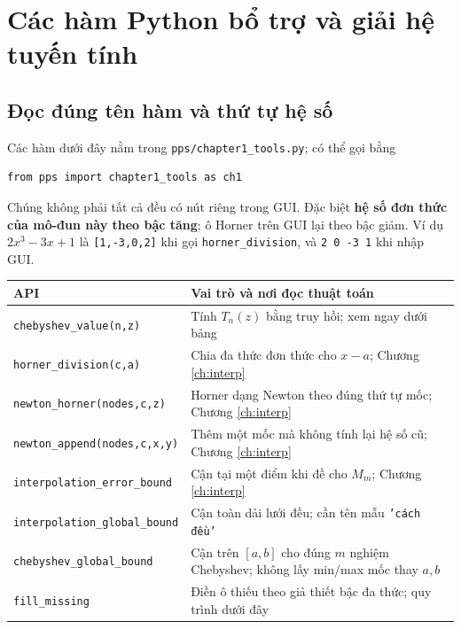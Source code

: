 \chapter{Các hàm Python bổ trợ và giải hệ tuyến tính}
\label{app:api}

\section{Đọc đúng tên hàm và thứ tự hệ số}
Các hàm dưới đây nằm trong \texttt{pps/chapter1\_tools.py}; có thể gọi bằng
\begin{verbatim}
from pps import chapter1_tools as ch1
\end{verbatim}
Chúng không phải tất cả đều có nút riêng trong GUI. Đặc biệt \textbf{hệ số đơn thức của mô-đun này theo bậc tăng}; ô Horner trên GUI lại theo bậc giảm. Ví dụ $2x^3-3x+1$ là \texttt{[1,-3,0,2]} khi gọi \texttt{horner\_division}, và \texttt{2 0 -3 1} khi nhập GUI.

\begin{center}\small\begin{tabular}{@{}p{}p{}@{}}\toprule
API & Vai trò và nơi đọc thuật toán\\\midrule
\texttt{chebyshev\_value(n,z)} & Tính $T_n(z)$ bằng truy hồi; xem ngay dưới bảng\\
\texttt{horner\_division(c,a)} & Chia đa thức đơn thức cho $x-a$; Chương \ref{ch:interp}\\
\texttt{newton\_horner(nodes,c,z)} & Horner dạng Newton theo đúng thứ tự mốc; Chương \ref{ch:interp}\\
\texttt{newton\_append(nodes,c,x,y)} & Thêm một mốc mà không tính lại hệ số cũ; Chương \ref{ch:interp}\\
\texttt{interpolation\_error\_bound} & Cận tại một điểm khi đề cho $M_m$; Chương \ref{ch:interp}\\
\texttt{interpolation\_global\_bound} & Cận toàn dải lưới đều; cần tên mẫu \texttt{'cách đều'}\\
\texttt{chebyshev\_global\_bound} & Cận trên $[a,b]$ cho đúng $m$ nghiệm Chebyshev; không lấy min/max mốc thay $a,b$\\
\texttt{fill\_missing} & Điền ô thiếu theo giả thiết bậc đa thức; quy trình dưới đây\\
\bottomrule\end{tabular}\end{center}

